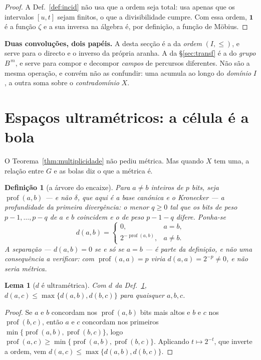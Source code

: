 \documentclass[11pt,a4paper]{article}
\newtheorem{lema}[teorema]{Lema}
\newtheorem{definicao}[teorema]{Definição}
\begin{document}
\begin{proof}
A Def.~\ref{def:incid} não usa que a ordem seja total: usa apenas que os
intervalos $[u,t]$ sejam finitos, o que a divisibilidade cumpre. Com essa ordem,
$\mathbf{1}$ é a função $\zeta$ e a sua inversa na álgebra é, por definição, a
função de Möbius.
\end{proof}

\medskip\noindent\textbf{Duas convoluções, dois papéis.} A desta secção é a da
\emph{ordem} $(I,\le)$, e serve para o directo e o inverso da própria aranha. A
da §\ref{sec:transf} é a do \emph{grupo} $B^{\,m}$, e serve para compor e
decompor \emph{campos} de percursos diferentes. Não são a mesma operação, e
convém não as confundir: uma acumula ao longo do \emph{domínio} $I$, a outra
soma sobre o \emph{contradomínio} $X$.

\section{Espaços ultramétricos: a célula é a bola}\label{sec:ultra}

\noindent O Teorema~\ref{thm:multiplicidade} não pediu métrica. Mas quando $X$
tem uma, a relação entre $G$ e as bolas diz o que a métrica é.

\begin{definicao}[a árvore do encaixe]\label{def:arvore}
Para $a\neq b$ inteiros de $p$ bits, seja $\operatorname{prof}(a,b)$ --- e não
$\delta$, que aqui é a base canónica e o Kronecker --- a profundidade da
primeira divergência: o menor $q\ge0$ tal que os bits de peso $p-1,\dots,p-q$ de
$a$ e $b$ coincidem e o de peso $p-1-q$ difere. Ponha-se
\[
d(a,b)=\begin{cases}0,&a=b,\\[2pt] 2^{-\operatorname{prof}(a,b)},&a\neq b.\end{cases}
\]
A separação --- $d(a,b)=0$ se e só se $a=b$ --- é parte da definição, e não uma
consequência a verificar: com $\operatorname{prof}(a,a)=p$ viria $d(a,a)=2^{-p}\neq0$, e não
seria métrica.
\end{definicao}

\begin{lema}[$d$ é ultramétrica]\label{lem:ultra}
Com $d$ da Def.~\ref{def:arvore}, $d(a,c)\le\max\{d(a,b),d(b,c)\}$ para
quaisquer $a,b,c$.
\end{lema}

\begin{proof}
Se $a$ e $b$ concordam nos $\operatorname{prof}(a,b)$ bits mais altos e $b$ e $c$ nos
$\operatorname{prof}(b,c)$, então $a$ e $c$ concordam nos primeiros
$\min\{\operatorname{prof}(a,b),\operatorname{prof}(b,c)\}$, logo
$\operatorname{prof}(a,c)\ge\min\{\operatorname{prof}(a,b),\operatorname{prof}(b,c)\}$. Aplicando $t\mapsto2^{-t}$, que
inverte a ordem, vem $d(a,c)\le\max\{d(a,b),d(b,c)\}$.
\end{proof}
\end{document}
